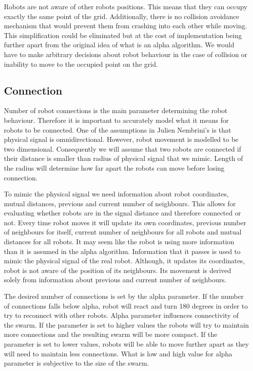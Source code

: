 \documentclass{article}
\begin{document}
Robots are not aware of other robots positions. This means that they can occupy exactly the same point of the grid. Additionally, there is no collision avoidance mechanism that would prevent them from crashing into each other while moving. This simplification could be eliminated but at the cost of implementation being further apart from the original idea of what is an alpha algorithm. We would have to make arbitrary decisions about robot behaviour in the case of collision or inability to move to the occupied point on the grid.

\subsection{Connection}
Number of robot connections is the main parameter determining the robot behaviour. Therefore it is important to accurately model what it means for robots to be connected. One of the assumptions in Julien Nembrini's \cite{Minimalist_Coherent_Swarming_of_Wireless_Networked_Autonomous_Mobile_Robots} is that physical signal is omnidirectional. However, robot movement is modelled to be two dimensional. Consequently we will assume that two robots are connected if their distance is smaller than radius of physical signal that we mimic. Length of the radius will determine how far apart the robots can move before losing connection.

To mimic the physical signal we need information about robot coordinates, mutual distances, previous and current number of neighbours. This allows for evaluating whether robots are in the signal distance and therefore connected or not. Every time robot moves it will update its own coordinates, previous number of neighbours for itself, current number of neighbours for all robots and mutual distances for all robots. It may seem like the robot is using more information than it is assumed in the alpha algorithm. Information that it passes is used to mimic the physical signal of the real robot. Although, it updates its coordinates, robot is not aware of the position of its neighbours. Its movement is derived solely from information about previous and current number of neighbours. 

The desired number of connections is set by the alpha parameter. If the number of connections falls below alpha, robot will react and turn 180 degrees in order to try to reconnect with other robots. Alpha parameter influences connectivity of the swarm. If the parameter is set to higher values the robots will try to maintain more connections and the resulting swarm will be more compact. If the parameter is set to lower values, robots will be able to move further apart as they will need to maintain less connections. What is low and high value for alpha parameter is subjective to the size of the swarm.
\end{document}
